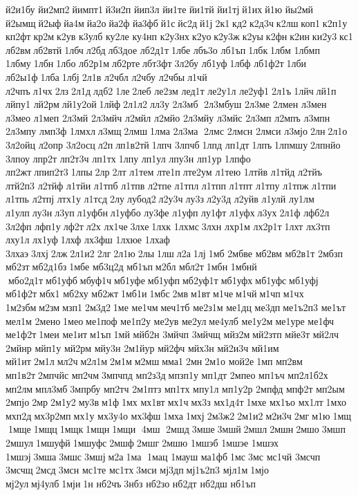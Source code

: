 й2и1бу 
йи2мп2 йимпт1 й3и2п 	йип3л 	йи1те 	йи1тй 	йи1тј й1их й1ю 	йы2мй 	й2ымщ й2ыф йа4м йа2о йа2ф 	йа3фб й1с йс2д й1ј 2к1 кд2 к2д3ч к2лш коп1 к2п1у 	кп2фт кр2м к2ув 	к3улб 	ку2ле 	ку4нп 
к2у3нх к2уо к2у3ж к2уы к2фн к2ин ки2у3 кс1 	лб2вм лб2втй 1лбч л2бд лб3дое 
лб2д1т 1лбе 	лбъ3о 	лб1ъп 1лбк 1лбм  	1лбмп 	1лбму 1лбн 1лбо 
лб2р1м лб2рте лбт3фт 3л2бу 	лб1уф 1лбф 
лб1ф2т 1лби 
лб2ы1ф 1лба 1лбј 2л1в 	л2чбл 	л2чбу 	л2чбы л1чй 	л2чпъ л1чх 2лз 2л1д лдб2 1ле 2леб 	ле2зм 	лед1т 
ле2у1л 
ле2уф1 2л1ъ 1лйч лй1п 	лйпу1 	лй2рм лй1у2ой 1лйф 2л1л2 лл3у 	2л3мб  2л3мбуш 	2л3ме  	2лмен 
л3мен  	л3мео 	л1меп 	2л3мй  
2л3мйч 	л2мйл 	л2мйо 
2л3мйу 	л3мйс 	2л3мп  	л2мпъ 	л3мпн 
2л3мпу 	лмп3ф 	1лмхл л3мщ 2лмш 1лма 	2л3ма  2лмс  	2лмсн 	2лмси 	л3мјо 2лн 2л1о 
3л2ойц 	л2опр 
3л2осц л2п лп1в2тй 1лпч 	3лпчб 1лпд 	лп1дт 1лпъ 1лпмшу 2лпнйо 	3лпоу 	лпр2т 
лп2т3ч 	лп1тх 1лпу 	лп1ул 	лпу3н 	лп1ур 	1лпфо 	лп2жт лпип2т3 1лпы 2лр 2лт  	л1тем 	лте1п лте2ум 	л1тею 	1лтйв 	л1тйд 	л2тйъ 
лтй2п3 	л2тйф 	л1тйи 	л1тпб 	л1тпв 	л2тпе 	л1тпл 	л1тпп 	л1тпт 	л1тпу 	л1тпж 	л1тпи 	л1тпь 	л2тпј 	лтх1у 	л1тсд 2лу лубод2 л2у3ч лу3з л2у3д 	л2уйв 	л1улй 	лу1лм 	л1улп лу3н л3уп л1уфбн л1уфбо 	лу3фе 	л1уфп 	лу1фт 	л1уфх л3ух 2л1ф 	лфб2л 	3л2фп  	лфп1у лф2т л2х 	лх1че 3лхе 1лхк 	1лхмс 3лхн 	лхр1м 
лх2р1т 1лхт 	лх3тп 	лху1л 	лх1уф 1лхф 	лх3фш 	1лхюе 	1лхаф 	3лхаэ 3лхј 2лж 2л1и2 2лг 2л1ю 2лы 1лш л2а 1лј 1мб  	2мбве 	мб2вм 
мб2в1т 	2мбзп 	мб2зт мб2д1бз 1мбе 
мб3ц2д 	мб1ъп м2бл 	мбл2т 1мбн  
1мбнй  мбо2д1т мб1уфб мбуф1ч мб1уфе мб1уфп мб2уф1т мб1уфх мб1уфс мб1уфј 
мб1ф2т мбх1 	мб2ху 	мб2жт 1мб1и 1мбс 2мв м1вт м1че м1чй м1чп м1чх 
1м2збм м2зм мзп1 2м3д2 1ме  	ме1чм меч1тб 
ме2з1м 	ме1дц 	ме3дп ме1ъ2п3 	ме1ът 	мел1м 	2мено 1мео ме1поф 
ме1п2у 	ме2ув 	ме2ул ме4улб 
ме1у2м ме1уре 	ме1фч 
ме1ф2т 1меи 	ме1ит м1ъп 1мй 	мйб2н 	3мйчп 	3мйчщ 	мйз2м мй2зтп 	мйе3т 	мй2лч 	2мйнр 	мйп1у 	мй2рм 	мйу3н 
2м1йур 	мй2фч 	мйх3н 
мй2и3ч 	мй1им 	мй1ит 2м1л мл2ч м2л1м 2м1м м2мш мма1 2мн 2м1о 	мой2е 1мп 	мп2вм 
мп1в2т 2мпчйс 	мп2чм 3мпчпд 
мп2з3д мпзп1у 	мп1дт 	2мпео 	мп1ъч 
мп2л1б2х 	мп2лм мпл3мб 3мпрбу 	мп2тч 
2м1птз 	мп1тх 	мпу1л 
мп1у2р 	2мпфд 	мпф2т 	мп2ым 	2мпјо 2мр 2м1у2 му3в м1ф 1мх  	мх1вт мх1ч мх3з 
мх1д4т 1мхе 	мх1ъо 	мх1лт 1мхо 	мхп2д мх3р2мп мх1у 
мх3у4о 	мх3фш 1мха 1мхј 2м3ж2 2м1и2 м2и3ч 2мг м1ю 1мщ  1мще 1мщц 1мщк 1мщн 1мщи  4мш  2мшд 3мше 3мшй 2мшл 2мшн 2мшо 3мшп 	2мшул 1мшуфй 1мшуфс 2мшф 2мшг 2мшю 	1мшэб 	1мшэе 	1мшэх 	1мшэј 3мша 3мшс 3мшј м2а 1ма  1мац 	1мауш 	ма1фб 1мс 3мс  	мс1чй 	3мсчп 	3мсчщ 2мсд 3мсн 	мс1те 	мс1тх 3мси 	мј3дп мј1ъ2п3 	мјл1м 1мјо 	мј2ул мј4улб 1мји 1н 	нб2чъ 3нбз 	нб2зо 	нб2дт 	нб2дш 	нб1ъп 
